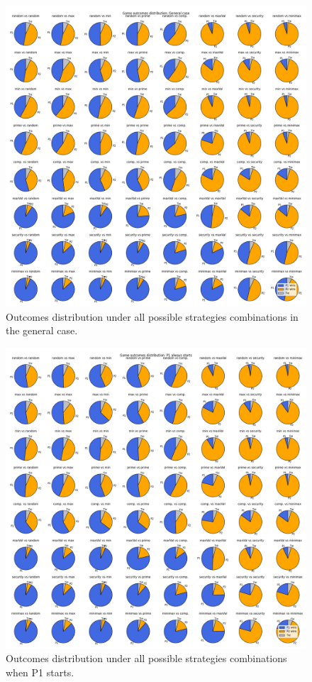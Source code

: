 \begin{figure}
	\centering
	\includegraphics[width=1\linewidth]{img/outcomes_distribution_general.png}
	\caption{Outcomes distribution under all possible strategies combinations in the general case.}
	\label{fig:outcomes_distribution_general}
\end{figure}

\begin{figure}
	\centering
	\includegraphics[width=1\linewidth]{img/outcomes_distribution_p1first.png}
	\caption{Outcomes distribution under all possible strategies combinations when P1 starts.}
	\label{fig:outcomes_distribution_p1first}
\end{figure}

